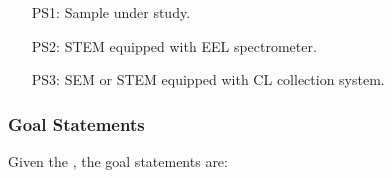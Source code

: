 \documentclass[12pt]{article}
\begin{document}
\begin{itemize}

	\item[PS1:] Sample under study.
	\item[PS2:] STEM equipped with EEL spectrometer.
	\item[PS3:] SEM or STEM equipped with CL collection system.

%

\end{itemize}





\subsubsection{Goal Statements}

\noindent Given the , the goal statements are:
\end{document}
